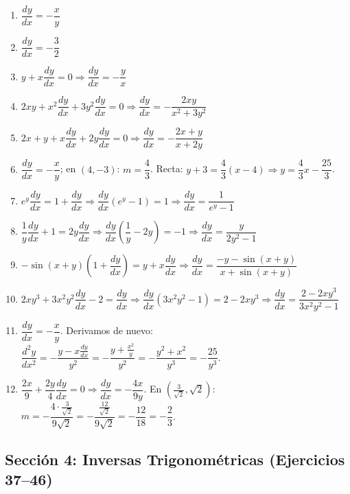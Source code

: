 \documentclass[12pt, letterpaper]{article}
\begin{document}
\begin{enumerate}[resume=respuestas, leftmargin=*, label=\textbf{\arabic*.}]
  \item $\dfrac{dy}{dx} = -\dfrac{x}{y}$
  \item $\dfrac{dy}{dx} = -\dfrac{3}{2}$
  \item $y + x\dfrac{dy}{dx} = 0 \Rightarrow \dfrac{dy}{dx} = -\dfrac{y}{x}$
  \item $2xy + x^2\dfrac{dy}{dx} + 3y^2\dfrac{dy}{dx} = 0 \Rightarrow \dfrac{dy}{dx} = -\dfrac{2xy}{x^2 + 3y^2}$
  \item $2x + y + x\dfrac{dy}{dx} + 2y\dfrac{dy}{dx} = 0 \Rightarrow \dfrac{dy}{dx} = -\dfrac{2x + y}{x + 2y}$
  \item $\dfrac{dy}{dx} = -\dfrac{x}{y}$; en $(4, -3)$: $m = \dfrac{4}{3}$. Recta: $y + 3 = \dfrac{4}{3}(x - 4) \Rightarrow y = \dfrac{4}{3}x - \dfrac{25}{3}$.
  \item $e^y \dfrac{dy}{dx} = 1 + \dfrac{dy}{dx} \Rightarrow \dfrac{dy}{dx}(e^y - 1) = 1 \Rightarrow \dfrac{dy}{dx} = \dfrac{1}{e^y - 1}$
  \item $\dfrac{1}{y}\dfrac{dy}{dx} + 1 = 2y\dfrac{dy}{dx} \Rightarrow \dfrac{dy}{dx}\left(\dfrac{1}{y} - 2y\right) = -1 \Rightarrow \dfrac{dy}{dx} = \dfrac{y}{2y^2 - 1}$
  \item $-\sin(x+y)\left(1 + \dfrac{dy}{dx}\right) = y + x\dfrac{dy}{dx} \Rightarrow \dfrac{dy}{dx} = \dfrac{-y - \sin(x+y)}{x + \sin(x+y)}$
  \item $2xy^3 + 3x^2 y^2 \dfrac{dy}{dx} - 2 = \dfrac{dy}{dx} \Rightarrow \dfrac{dy}{dx}(3x^2 y^2 - 1) = 2 - 2xy^3 \Rightarrow \dfrac{dy}{dx} = \dfrac{2 - 2xy^3}{3x^2 y^2 - 1}$
  \item $\dfrac{dy}{dx} = -\dfrac{x}{y}$. Derivamos de nuevo: $\dfrac{d^2y}{dx^2} = -\dfrac{y - x\frac{dy}{dx}}{y^2} = -\dfrac{y + \frac{x^2}{y}}{y^2} = -\dfrac{y^2 + x^2}{y^3} = -\dfrac{25}{y^3}$.
  \item $\dfrac{2x}{9} + \dfrac{2y}{4}\dfrac{dy}{dx} = 0 \Rightarrow \dfrac{dy}{dx} = -\dfrac{4x}{9y}$. En $\left(\frac{3}{\sqrt{2}}, \sqrt{2}\right)$: $m = -\dfrac{4 \cdot \frac{3}{\sqrt{2}}}{9\sqrt{2}} = -\dfrac{\frac{12}{\sqrt{2}}}{9\sqrt{2}} = -\dfrac{12}{18} = -\dfrac{2}{3}$.
\end{enumerate}


\subsection*{Sección 4: Inversas Trigonométricas (Ejercicios 37--46)}
\end{document}

